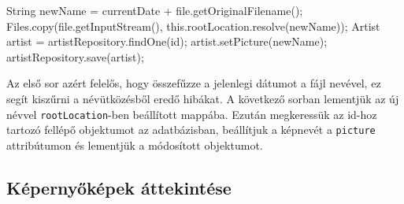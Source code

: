\begin{java}
String newName =  currentDate + file.getOriginalFilename();
Files.copy(file.getInputStream(),
this.rootLocation.resolve(newName));
Artist artist = artistRepository.findOne(id);
artist.setPicture(newName);
artistRepository.save(artist);
\end{java}
Az első sor azért felelős, hogy összefűzze a jelenlegi dátumot  a fájl nevével, ez segít kiszűrni a névütközésből eredő hibákat. A következő sorban lementjük az új névvel \texttt{rootLocation}-ben beállított mappába. Ezután megkeressük az id-hoz tartozó fellépő objektumot az adatbázisban, beállítjuk a képnevét a \texttt{picture} attribútumon és lementjük a módosított objektumot.

\subsection{Képernyőképek áttekintése}
